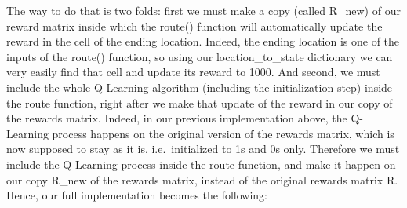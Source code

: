 \documentclass[]{book}
\begin{document}
The way to do that is two folds: first we must make a copy (called R\_new) of our reward matrix inside which the route() function will automatically update the reward in the cell of the ending location. Indeed, the ending location is one of the inputs of the route() function, so using our location\_to\_state dictionary we can very easily find that cell and update its reward to 1000. And second, we must include the whole Q-Learning algorithm (including the initialization step) inside the route function, right after we make that update of the reward in our copy of the rewards matrix. Indeed, in our previous implementation above, the Q-Learning process happens on the original version of the rewards matrix, which is now supposed to stay as it is, i.e.~initialized to 1s and 0s only. Therefore we must include the Q-Learning process inside the route function, and make it happen on our copy R\_new of the rewards matrix, instead of the original rewards matrix R. Hence, our full implementation becomes the following:
\end{document}

